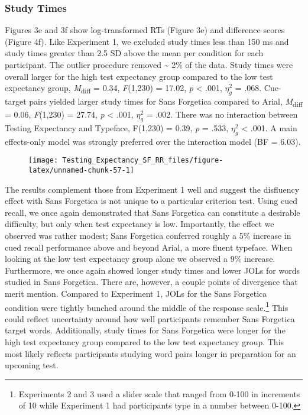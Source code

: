 \documentclass[
  english,
  jou]{apa7}
\begin{document}
\hypertarget{study-times-1}{%
\subsubsection{Study Times}\label{study-times-1}}

Figures 3e and 3f show log-transformed RTs (Figure 3e) and difference scores (Figure 4f). Like Experiment 1, we excluded study times less than 150 ms and study times greater than 2.5 SD above the mean per condition for each participant. The outlier procedure removed \textasciitilde{} 2\% of the data. Study times were overall larger for the high test expectancy group compared to the low test expectancy group, \emph{M}\textsubscript{diff} = 0.34, \emph{F}(1,230) = 17.02, \emph{p} \textless{} .001, \(\eta_{g}^{2}\) = .068. Cue-target pairs yielded larger study times for Sans Forgetica compared to Arial, \emph{M}\textsubscript{diff} = 0.06, \emph{F}(1,230) = 27.74, \emph{p} \textless{} .001, \(\eta_{g}^{2}\) = .002. There was no interaction between Testing Expectancy and Typeface, F(1,230) = 0.39, \emph{p} = .533, \(\eta_{g}^{2}\) \textless{} .001. A main effects-only model was strongly preferred over the interaction model (BF = 6.03).

\begin{figure}

{\centering \texttt{[image: Testing\_Expectancy\_SF\_RR\_files/figure-latex/unnamed-chunk-57-1]} 

}

\caption{ }\label{fig:unnamed-chunk-57}
\end{figure}

The results complement those from Experiment 1 well and suggest the disfluency effect with Sans Forgetica is not unique to a particular criterion test. Using cued recall, we once again demonstrated that Sans Forgetica can constitute a desirable difficulty, but only when test expectancy is low. Importantly, the effect we observed was rather modest; Sans Forgetica conferred roughly a 5\% increase in cued recall performance above and beyond Arial, a more fluent typeface. When looking at the low test expectancy group alone we observed a 9\% increase. Furthermore, we once again showed longer study times and lower JOLs for words studied in Sans Forgetica. There are, however, a couple points of divergence that merit mention. Compared to Experiment 1, JOLs for the Sans Forgetica condition were tightly bunched around the middle of the response scale.\footnote{Experiments 2 and 3 used a slider scale that ranged from 0-100 in increments of 10 while Experiment 1 had participants type in a number between 0-100.} This could reflect uncertainty around how well participants remember Sans Forgetica target words. Additionally, study times for Sans Forgetica were longer for the high test expectancy group compared to the low test expectancy group. This most likely reflects participants studying word pairs longer in preparation for an upcoming test.
\end{document}
